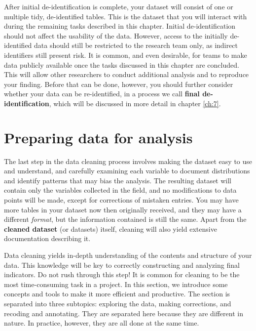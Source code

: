 After initial de-identification is complete, 
your dataset will consist of one or multiple tidy, 
de-identified tables.
This is the dataset that you will interact with 
during the remaining tasks described in this chapter.
Initial de-identification should not affect the usability of the data.
However, access to the initially de-identified data 
should still be restricted to the research team only,
as indirect identifiers still present risk.
It is common, and even desirable, for teams to make data publicly available
once the tasks discussed in this chapter are concluded.
This will allow other researchers to conduct additional analysis and to reproduce your finding.
Before that can be done, however,
you should further consider whether your data can be re-identified,
in a process we call \textbf{final de-identification},
which will be discussed in more detail in chapter \ref{ch:7}.


\section{Preparing data for analysis}

The last step in the data cleaning process involves
making the dataset easy to use and understand, and 
carefully examining each variable to document distributions 
and identify patterns that may bias the analysis.
The resulting dataset will contain only the variables collected in the field, and
no modifications to data points will be made, 
except for corrections of mistaken entries.
You may have more tables in your dataset now then originally received,
and they may have a different \textit{format},
but the information contained is still the same.
Apart from the \textbf{cleaned dataset} (or datasets) itself,
cleaning will also yield extensive documentation describing it.

Data cleaning yields in-depth understanding of the contents and structure of your data.
This knowledge will be key to correctly constructing and analyzing final indicators.
Do not rush through this step!
It is common for cleaning to be the most time-consuming task in a project.
In this section, we introduce some concepts and tools to make it more efficient and productive.
The section is separated into three subtopics:
exploring the data, making corrections, and recoding and annotating.
They are separated here because they are different in nature.
In practice, however, they are all done at the same time.


